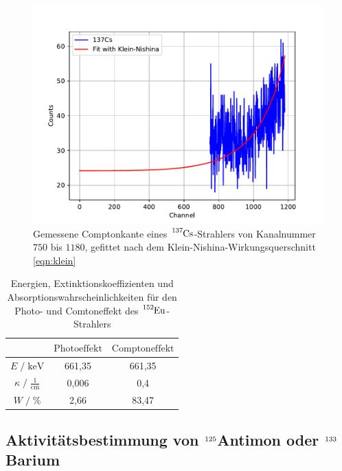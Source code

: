 \begin{figure}[H]
  \centering
  \includegraphics[scale=0.6]{content/kleinnishina.pdf}
  \caption{Gemessene Comptonkante eines $\ce{^{137}Cs}$-Strahlers von Kanalnummer $\num{750}$ bis $\num{1180}$,
  gefittet nach dem Klein-Nishina-Wirkungsquerschnitt \eqref{eqn:klein}}
  \label{fig:klein}
\end{figure}

\begin{table}
  \centering
  \caption{Energien, Extinktionskoeffizienten und Absorptionswahrscheinlichkeiten für den Photo- und Comtoneffekt des $\ce{^{152}Eu}$-Strahlers}
  \label{tab:mess3}
  \begin{tabular}{c c c }
  \toprule
  $ $ & $\text{Photoeffekt}$ & $\text{Comptoneffekt}$ \\
  \midrule
  $E \;/\; \si{\kilo\eV}$                 & 661,35 & 661,35 \\
  $\kappa \;/\; \frac{1}{\si{\centi\meter}}$ & 0,006  & 0,4    \\
  $W \;/\; \si{\percent}$                 & 2,66   & 83,47\\
  \bottomrule
  \end{tabular}
\end{table}



\subsection{Aktivitätsbestimmung von  $\ce{^{125}}$Antimon oder  $\ce{^{133}}$Barium }


